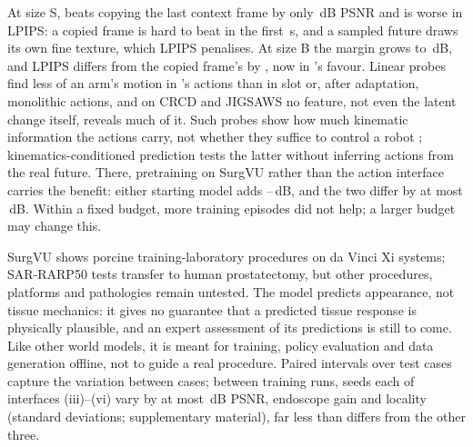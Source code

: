 At size S, \method{} beats copying the last context frame by only \,dB PSNR and is worse in LPIPS: a copied frame is hard to beat in the first \,s, and a sampled future draws its own fine texture, which LPIPS penalises. At size B the margin grows to \,dB, and LPIPS differs from the copied frame's by  , now in \method{}'s favour. Linear probes find less of an arm's motion in \method{}'s actions than in slot or, after adaptation, monolithic actions, and on CRCD and JIGSAWS no feature, not even the latent change itself, reveals much of it. Such probes show how much kinematic information the actions carry, not whether they suffice to control a robot \cite{lamstudy}; kinematics-conditioned prediction tests the latter without inferring actions from the real future. There, pretraining on SurgVU rather than the action interface carries the benefit: either starting model adds --\,dB, and the two differ by at most \,dB. Within a fixed budget, more training episodes did not help; a larger budget may change this.

SurgVU shows porcine training-laboratory procedures on da Vinci Xi systems; SAR-RARP50 tests transfer to human prostatectomy, but other procedures, platforms and pathologies remain untested. The model predicts appearance, not tissue mechanics: it gives no guarantee that a predicted tissue response is physically plausible, and an expert assessment of its predictions is still to come. Like other world models, it is meant for training, policy evaluation and data generation offline, not to guide a real procedure. Paired intervals over test cases capture the variation between cases; between training runs,  seeds each of interfaces (iii)--(vi) vary by at most \,dB PSNR,  endoscope gain and  locality (standard deviations; supplementary material), far less than \method{} differs from the other three.

